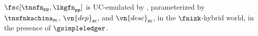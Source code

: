 \begin{corollary}
  $\fsc[\tnsfn_{\mathsf{pp}}, \lkgfn_{\mathsf{pp}}]$ is UC-emulated by
  \kachina, parameterized by $\tnsfnkachina_{\mathsf{zc}}$, $\vn{dep}_{\mathsf{zc}}$,
  and $\vn{desc}_{\mathsf{zc}}$, in the $\fnizk$-hybrid world, in the presence
  of $\gsimpleledger$.
\end{corollary}


